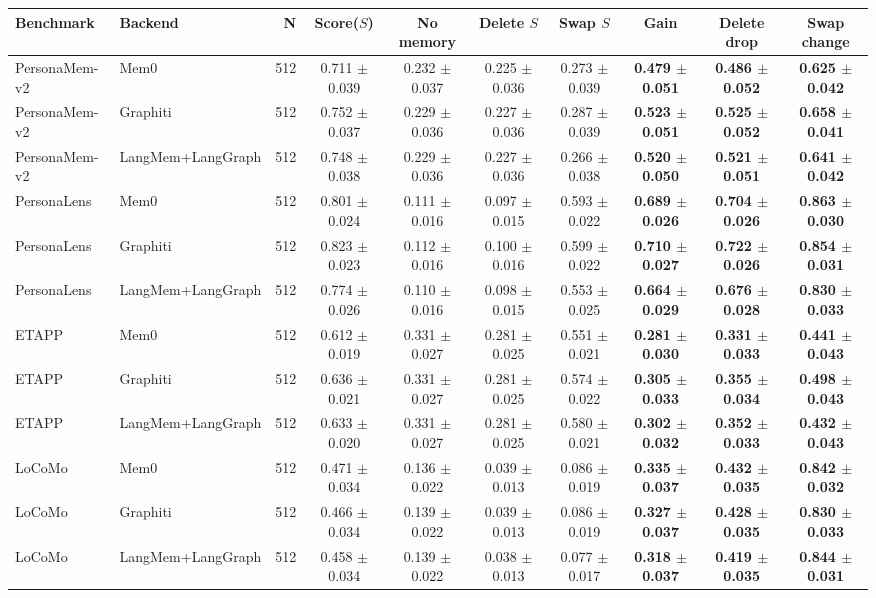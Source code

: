 \begin{table}[t]
\centering
\small
\setlength{\tabcolsep}{3pt}
\begin{tabular}{llrccccccc}
\toprule
Benchmark & Backend & N & Score($S$) & No memory & Delete $S$ & Swap $S$ & Gain & Delete drop & Swap change \\
\midrule
PersonaMem-v2 & Mem0 & 512 & 0.711 $\pm$ 0.039 & 0.232 $\pm$ 0.037 & 0.225 $\pm$ 0.036 & 0.273 $\pm$ 0.039 & \textbf{0.479 $\pm$ 0.051} & \textbf{0.486 $\pm$ 0.052} & \textbf{0.625 $\pm$ 0.042} \\
PersonaMem-v2 & Graphiti & 512 & 0.752 $\pm$ 0.037 & 0.229 $\pm$ 0.036 & 0.227 $\pm$ 0.036 & 0.287 $\pm$ 0.039 & \textbf{0.523 $\pm$ 0.051} & \textbf{0.525 $\pm$ 0.052} & \textbf{0.658 $\pm$ 0.041} \\
PersonaMem-v2 & LangMem+LangGraph & 512 & 0.748 $\pm$ 0.038 & 0.229 $\pm$ 0.036 & 0.227 $\pm$ 0.036 & 0.266 $\pm$ 0.038 & \textbf{0.520 $\pm$ 0.050} & \textbf{0.521 $\pm$ 0.051} & \textbf{0.641 $\pm$ 0.042} \\
\addlinespace
PersonaLens & Mem0 & 512 & 0.801 $\pm$ 0.024 & 0.111 $\pm$ 0.016 & 0.097 $\pm$ 0.015 & 0.593 $\pm$ 0.022 & \textbf{0.689 $\pm$ 0.026} & \textbf{0.704 $\pm$ 0.026} & \textbf{0.863 $\pm$ 0.030} \\
PersonaLens & Graphiti & 512 & 0.823 $\pm$ 0.023 & 0.112 $\pm$ 0.016 & 0.100 $\pm$ 0.016 & 0.599 $\pm$ 0.022 & \textbf{0.710 $\pm$ 0.027} & \textbf{0.722 $\pm$ 0.026} & \textbf{0.854 $\pm$ 0.031} \\
PersonaLens & LangMem+LangGraph & 512 & 0.774 $\pm$ 0.026 & 0.110 $\pm$ 0.016 & 0.098 $\pm$ 0.015 & 0.553 $\pm$ 0.025 & \textbf{0.664 $\pm$ 0.029} & \textbf{0.676 $\pm$ 0.028} & \textbf{0.830 $\pm$ 0.033} \\
\addlinespace
ETAPP & Mem0 & 512 & 0.612 $\pm$ 0.019 & 0.331 $\pm$ 0.027 & 0.281 $\pm$ 0.025 & 0.551 $\pm$ 0.021 & \textbf{0.281 $\pm$ 0.030} & \textbf{0.331 $\pm$ 0.033} & \textbf{0.441 $\pm$ 0.043} \\
ETAPP & Graphiti & 512 & 0.636 $\pm$ 0.021 & 0.331 $\pm$ 0.027 & 0.281 $\pm$ 0.025 & 0.574 $\pm$ 0.022 & \textbf{0.305 $\pm$ 0.033} & \textbf{0.355 $\pm$ 0.034} & \textbf{0.498 $\pm$ 0.043} \\
ETAPP & LangMem+LangGraph & 512 & 0.633 $\pm$ 0.020 & 0.331 $\pm$ 0.027 & 0.281 $\pm$ 0.025 & 0.580 $\pm$ 0.021 & \textbf{0.302 $\pm$ 0.032} & \textbf{0.352 $\pm$ 0.033} & \textbf{0.432 $\pm$ 0.043} \\
\addlinespace
LoCoMo & Mem0 & 512 & 0.471 $\pm$ 0.034 & 0.136 $\pm$ 0.022 & 0.039 $\pm$ 0.013 & 0.086 $\pm$ 0.019 & \textbf{0.335 $\pm$ 0.037} & \textbf{0.432 $\pm$ 0.035} & \textbf{0.842 $\pm$ 0.032} \\
LoCoMo & Graphiti & 512 & 0.466 $\pm$ 0.034 & 0.139 $\pm$ 0.022 & 0.039 $\pm$ 0.013 & 0.086 $\pm$ 0.019 & \textbf{0.327 $\pm$ 0.037} & \textbf{0.428 $\pm$ 0.035} & \textbf{0.830 $\pm$ 0.033} \\
LoCoMo & LangMem+LangGraph & 512 & 0.458 $\pm$ 0.034 & 0.139 $\pm$ 0.022 & 0.038 $\pm$ 0.013 & 0.077 $\pm$ 0.017 & \textbf{0.318 $\pm$ 0.037} & \textbf{0.419 $\pm$ 0.035} & \textbf{0.844 $\pm$ 0.031} \\
\bottomrule
\end{tabular}
\end{table}
